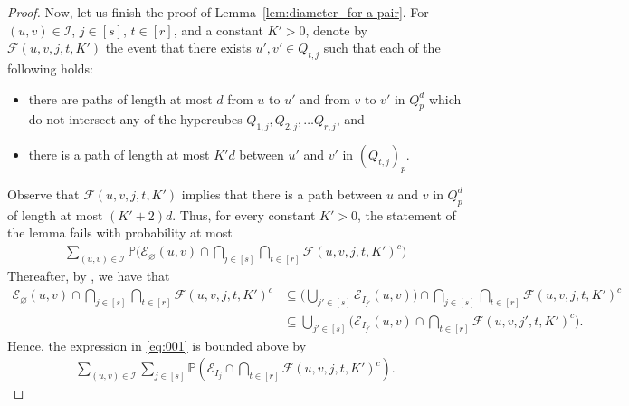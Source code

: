 \documentclass[10pt,a4paper]{amsart}
\newcommand{\cE}{\mathcal{E}}
\newcommand{\cF}{\mathcal{F}}
\newcommand{\cI}{\mathcal{I}}
\begin{document}
\begin{proof}
Now, let us finish the proof of Lemma~\ref{lem:diameter_for a pair}. For $(u,v)\in \cI$, $j\in [s]$, $t\in [r]$, and a constant $K'>0$, denote by $\cF(u,v,j,t,K')$ the event that there exists $u',v'\in Q_{t,j}$ such that each of the following holds:
\begin{itemize}
    \item there are paths of length at most $d$ from $u$ to $u'$ and from $v$ to $v'$ in $Q^d_p$ which do not intersect any of the hypercubes $Q_{1,j},Q_{2,j},\ldots Q_{r,j}$, and
    \item there is a path of length at most $K'd$ between $u'$ and $v'$ in $(Q_{t,j})_p$.
\end{itemize}
Observe that $\cF(u,v,j,t,K')$ implies that there is a path between $u$ and $v$ in $Q^d_p$ of length at most $(K'+2)d$. Thus, for every constant $K'>0$,
the statement of the lemma fails with probability at most 
\begin{align}\label{eq:001}
    \sum_{(u,v)\in \cI}  \mathbb{P}\bigg(\cE_{\varnothing}(u,v)\cap \bigcap_{j\in [s]} \bigcap_{t\in[r]}\cF(u,v,j,t,K')^c\bigg)
\end{align}
Thereafter, by , we have that
\begin{align*}
\cE_{\varnothing}(u,v)\cap \bigcap_{j\in [s]} \bigcap_{t\in[r]}\cF(u,v,j,t,K')^c
&\subseteq \bigg(\bigcup_{j'\in [s]}\cE_{I_{j'}}(u,v)\bigg)\cap \bigcap_{j\in [s]} \bigcap_{t\in[r]}\cF(u,v,j,t,K')^c\\
&\subseteq \bigcup_{j'\in [s]}\bigg(\cE_{I_{j'}}(u,v)\cap  \bigcap_{t\in[r]}\cF(u,v,j',t,K')^c  \bigg).
\end{align*}
Hence, the expression in \eqref{eq:001} is bounded above by 
\begin{align}\label{eq:002}
    \sum_{(u,v)\in \cI}  \sum_{j\in[s]}\mathbb{P}\left(\cE_{I_j}\cap \bigcap_{t\in[r]}\cF(u,v,j,t,K')^c\right).
\end{align}


\end{proof}
\end{document}
